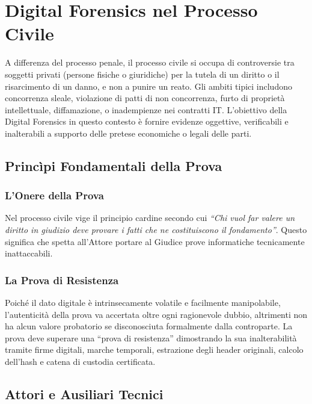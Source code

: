 \documentclass[11pt,a4paper]{article}
\begin{document}

\section{Digital Forensics nel Processo Civile}

A differenza del processo penale, il processo civile si occupa di controversie tra soggetti privati (persone fisiche o giuridiche) per la tutela di un diritto o il risarcimento di un danno, e non a punire un reato. 
Gli ambiti tipici includono concorrenza sleale, violazione di patti di non concorrenza, furto di proprietà intellettuale, diffamazione, o inadempienze nei contratti IT.
L'obiettivo della Digital Forensics in questo contesto è fornire evidenze oggettive, verificabili e inalterabili a supporto delle pretese economiche o legali delle parti.

\subsection{Princìpi Fondamentali della Prova}

\subsubsection{L'Onere della Prova}
Nel processo civile vige il principio cardine secondo cui \textit{``Chi vuol far valere un diritto in giudizio deve provare i fatti che ne costituiscono il fondamento''}. Questo significa che spetta all'Attore portare al Giudice prove informatiche tecnicamente inattaccabili.

\subsubsection{La Prova di Resistenza}
Poiché il dato digitale è intrinsecamente volatile e facilmente manipolabile, l'autenticità della prova va accertata oltre ogni ragionevole dubbio, altrimenti non ha alcun valore probatorio se disconosciuta formalmente dalla controparte.
La prova deve superare una ``prova di resistenza'' dimostrando la sua inalterabilità tramite firme digitali, marche temporali, estrazione degli header originali, calcolo dell'hash e catena di custodia certificata.

\subsection{Attori e Ausiliari Tecnici}
\end{document}
